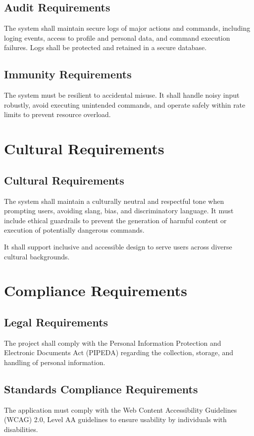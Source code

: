 \documentclass[12pt]{article}
\begin{document}
\subsection{Audit Requirements}
The system shall maintain secure logs of major actions and commands, including loging events, access to profile and personal data, and command execution failures. Logs shall be protected and retained in a secure database. 
\subsection{Immunity Requirements}
The system must be resilient to accidental misuse. It shall handle noisy input robustly, avoid executing unintended commands, and operate safely within rate limits to prevent resource overload. 

\section{Cultural Requirements}
\subsection{Cultural Requirements}
The system shall maintain a culturally neutral and respectful tone when prompting users, avoiding slang, bias, and discriminatory language. It must include ethical guardrails to prevent the generation of harmful content or execution of potentially dangerous commands.

It shall support inclusive and accessible design to serve users across diverse cultural backgrounds.

\section{Compliance Requirements}
\subsection{Legal Requirements}
The project shall comply with the Personal Information Protection and Electronic Documents Act (PIPEDA) regarding the collection, storage, and handling of personal information.

\subsection{Standards Compliance Requirements}
The application must comply with the Web Content Accessibility Guidelines (WCAG) 2.0, Level AA guidelines to ensure usability by individuals with disabilities.
\end{document}

